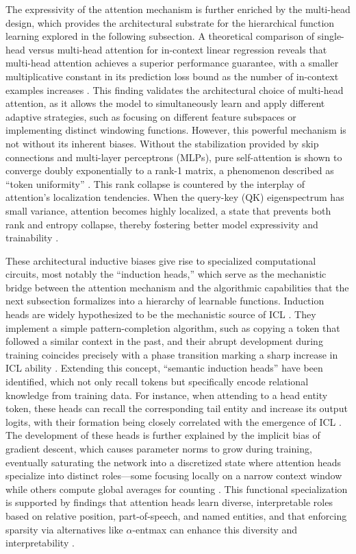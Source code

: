 \documentclass[11pt]{article}
\begin{document}
The expressivity of the attention mechanism is further enriched by the multi-head design, which provides the architectural substrate for the hierarchical function learning explored in the following subsection. A theoretical comparison of single-head versus multi-head attention for in-context linear regression reveals that multi-head attention achieves a superior performance guarantee, with a smaller multiplicative constant in its prediction loss bound as the number of in-context examples increases \cite{ref91}. This finding validates the architectural choice of multi-head attention, as it allows the model to simultaneously learn and apply different adaptive strategies, such as focusing on different feature subspaces or implementing distinct windowing functions. However, this powerful mechanism is not without its inherent biases. Without the stabilization provided by skip connections and multi-layer perceptrons (MLPs), pure self-attention is shown to converge doubly exponentially to a rank-1 matrix, a phenomenon described as ``token uniformity'' \cite{ref92}. This rank collapse is countered by the interplay of attention's localization tendencies. When the query-key (QK) eigenspectrum has small variance, attention becomes highly localized, a state that prevents both rank and entropy collapse, thereby fostering better model expressivity and trainability \cite{ref93}.

These architectural inductive biases give rise to specialized computational circuits, most notably the ``induction heads,'' which serve as the mechanistic bridge between the attention mechanism and the algorithmic capabilities that the next subsection formalizes into a hierarchy of learnable functions. Induction heads are widely hypothesized to be the mechanistic source of ICL \cite{ref54}. They implement a simple pattern-completion algorithm, such as copying a token that followed a similar context in the past, and their abrupt development during training coincides precisely with a phase transition marking a sharp increase in ICL ability \cite{ref54}. Extending this concept, ``semantic induction heads'' have been identified, which not only recall tokens but specifically encode relational knowledge from training data. For instance, when attending to a head entity token, these heads can recall the corresponding tail entity and increase its output logits, with their formation being closely correlated with the emergence of ICL \cite{ref58}. The development of these heads is further explained by the implicit bias of gradient descent, which causes parameter norms to grow during training, eventually saturating the network into a discretized state where attention heads specialize into distinct roles---some focusing locally on a narrow context window while others compute global averages for counting \cite{ref94}. This functional specialization is supported by findings that attention heads learn diverse, interpretable roles based on relative position, part-of-speech, and named entities, and that enforcing sparsity via alternatives like \(\alpha\)-entmax can enhance this diversity and interpretability \cite{ref95,ref96}.
\end{document}
